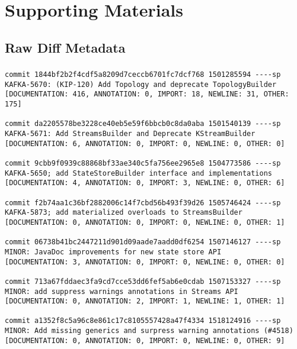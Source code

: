 \chapter{Supporting Materials}


\section{Raw Diff Metadata}

\subsection{}
\label{sec:Topology-Diff-Metadata}

\begin{lstlisting}
commit 1844bf2b2f4cdf5a8209d7ceccb6701fc7dcf768 1501285594 ----sp 
KAFKA-5670: (KIP-120) Add Topology and deprecate TopologyBuilder                                     
[DOCUMENTATION: 416, ANNOTATION: 0, IMPORT: 18, NEWLINE: 31, OTHER: 175]

commit da2205578be3228ce40eb5e59f6bbcb0c8da0aba 1501540139 ----sp 
KAFKA-5671: Add StreamsBuilder and Deprecate KStreamBuilder                                          
[DOCUMENTATION: 6, ANNOTATION: 0, IMPORT: 0, NEWLINE: 0, OTHER: 0]

commit 9cbb9f0939c88868bf33ae340c5fa756ee2965e8 1504773586 ----sp 
KAFKA-5650; add StateStoreBuilder interface and implementations                                      
[DOCUMENTATION: 4, ANNOTATION: 0, IMPORT: 3, NEWLINE: 0, OTHER: 6]

commit f2b74aa1c36bf2882006c14f7cbd56b493f39d26 1505746424 ----sp 
KAFKA-5873; add materialized overloads to StreamsBuilder                                             
[DOCUMENTATION: 0, ANNOTATION: 0, IMPORT: 0, NEWLINE: 0, OTHER: 1]

commit 06738b41bc2447211d901d09aade7aadd0df6254 1507146127 ----sp 
MINOR: JavaDoc improvements for new state store API                                                  
[DOCUMENTATION: 3, ANNOTATION: 0, IMPORT: 0, NEWLINE: 0, OTHER: 0]

commit 713a67fddaec3fa9cd7cce53dd6fef5ab6e0cdab 1507153327 ----sp 
MINOR: add suppress warnings annotations in Streams API                                              
[DOCUMENTATION: 0, ANNOTATION: 2, IMPORT: 1, NEWLINE: 1, OTHER: 1]

commit a1352f8c5a96c8e861c17c8105557428a47f4334 1518124916 ----sp 
MINOR: Add missing generics and surpress warning annotations (#4518)                                 
[DOCUMENTATION: 0, ANNOTATION: 0, IMPORT: 0, NEWLINE: 0, OTHER: 9]


\end{lstlisting}
